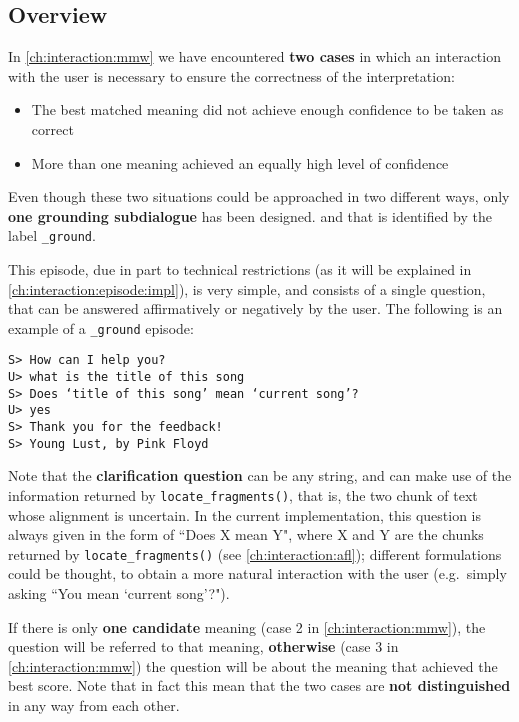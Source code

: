 \subsection{Overview}
In \ref{ch:interaction:mmw} we have encountered \textbf{two cases} in which an interaction with the user is necessary to ensure the correctness of the interpretation:
\begin{itemize}
	\item The best matched meaning did not achieve enough confidence to be taken as correct
	\item More than one meaning achieved an equally high level of confidence
\end{itemize}

Even though these two situations could be approached in two different ways, only \textbf{one grounding subdialogue} has been designed. and that is identified by the label \texttt{\_ground}.

This episode, due in part to technical restrictions (as it will be explained in \ref{ch:interaction:episode:impl}), is very simple, and consists of a single question, that can be answered affirmatively or negatively by the user. The following is an example of a \texttt{\_ground} episode:

\texttt{S> How can I help you? \\
U> what is the title of this song \\
S> Does `title of this song' mean `current song'? \\
U> yes \\
S> Thank you for the feedback! \\
S> Young Lust, by Pink Floyd}

Note that the \textbf{clarification question} can be any string, and can make use of the information returned by \texttt{locate\_fragments()}, that is, the two chunk of text whose alignment is uncertain. In the current implementation, this question is always given in the form of ``Does X mean Y", where X and Y are the chunks returned by \texttt{locate\_fragments()} (see \ref{ch:interaction:afl}); different formulations could be thought, to obtain a more natural interaction with the user (e.g.\ simply asking ``You mean `current song'?").

If there is only \textbf{one candidate} meaning (case 2 in \ref{ch:interaction:mmw}), the question will be referred to that meaning, \textbf{otherwise} (case 3 in \ref{ch:interaction:mmw}) the question will be about the meaning that achieved the best score. Note that in fact this mean that the two cases are \textbf{not distinguished} in any way from each other.

